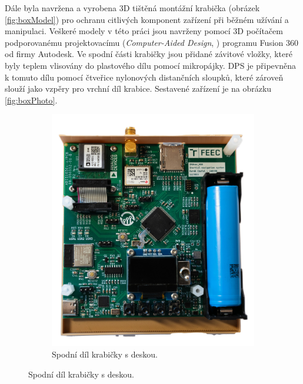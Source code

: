 Dále byla navržena a vyrobena 3D tištěná montážní krabička (obrázek \ref{fig:boxModel}) pro ochranu citlivých komponent zařízení při běžném užívání a manipulaci. Veškeré modely v této práci jsou navrženy pomocí 3D počítačem podporovanému
projektovacímu (\emph{Computer-Aided Design}, ) programu Fusion 360 od firmy Autodesk. Ve spodní části krabičky jsou přidané závitové vložky, které byly teplem vlisovány do plastového dílu pomocí mikropájky. \ac{DPS} je připevněna k tomuto dílu pomocí čtveřice nylonových distančních sloupků, které zároveň slouží jako vzpěry pro vrchní díl krabice. Sestavené zařízení je na obrázku \ref{fig:boxPhoto}.

\begin{figure}
     \centering
     \begin{subfigure}[b]{0.4\textwidth}
         \centering
         \includegraphics[width=\textwidth]{obrazky/imuNavPCB}
         \caption{Spodní díl krabičky s deskou.}
       

\end{subfigure}
\end{figure}

